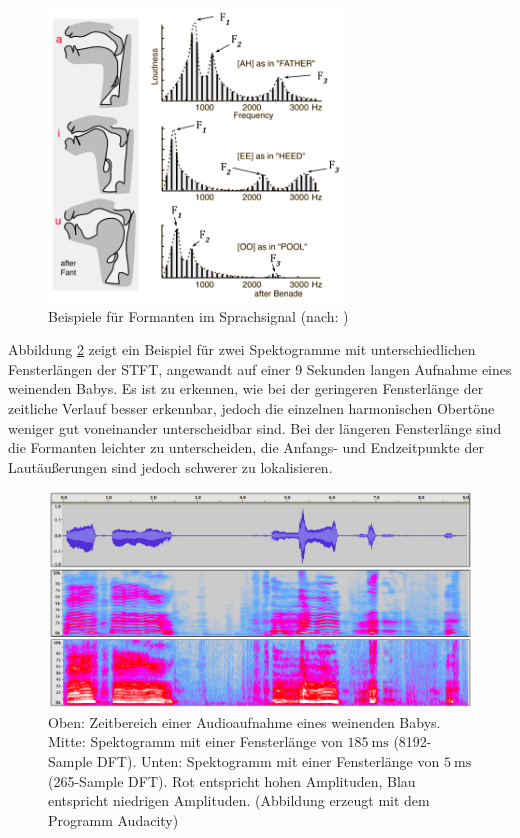 \begin{figure}[h]
	\centering
	\includegraphics[width=0.7\textwidth]{bilder/formants02.png}
	\caption[Beispiele für Formanten im Sprachsignal]{Beispiele für Formanten im Sprachsignal (nach: \cite{benade})}
	\label{img:formants}
\end{figure}	


Abbildung \ref{img:spectoExample} zeigt ein Beispiel für zwei Spektogramme mit unterschiedlichen Fensterlängen der STFT, angewandt auf einer 9 Sekunden langen Aufnahme eines weinenden Babys. Es ist zu erkennen, wie bei der geringeren Fensterlänge der zeitliche Verlauf besser erkennbar, jedoch die einzelnen harmonischen Obertöne weniger gut voneinander unterscheidbar sind. Bei der längeren Fensterlänge sind die Formanten leichter zu unterscheiden, die Anfangs- und Endzeitpunkte der Lautäußerungen sind jedoch schwerer zu lokalisieren.

\begin{figure}[h]
	\centering
	\includegraphics[width=1\textwidth]{bilder/spectogram03.png}
	\caption[Spektogramm einer Audioaufnahme eines Babys]{Oben: Zeitbereich einer Audioaufnahme eines weinenden Babys. Mitte: Spektogramm mit einer Fensterlänge von $\SI{185}{\milli\second}$ (8192-Sample DFT). Unten: Spektogramm mit einer Fensterlänge von $\SI{5}{\milli\second}$ (265-Sample DFT). Rot entspricht hohen Amplituden, Blau entspricht niedrigen Amplituden. (Abbildung erzeugt mit dem Programm \glqq Audacity\grqq)}
	\label{img:spectoExample}
\end{figure}	

